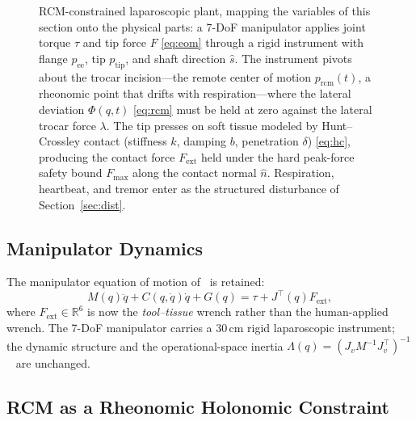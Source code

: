 \begin{figure}[t]
{}
\caption{RCM-constrained laparoscopic plant, mapping the variables of this
section onto the physical parts: a 7-DoF manipulator applies joint torque
$\tau$ and tip force $F$ \eqref{eq:eom} through a rigid instrument with flange
$p_\text{ee}$, tip $p_\text{tip}$, and shaft direction $\hat s$. The instrument
pivots about the trocar incision---the remote center of motion $p_\text{rcm}(t)$,
a rheonomic point that drifts with respiration---where the lateral deviation
$\Phi(q,t)$ \eqref{eq:rcm} must be held at zero against the lateral trocar force
$\lambda$. The tip presses on soft tissue modeled by Hunt--Crossley contact
(stiffness $k$, damping $b$, penetration $\delta$) \eqref{eq:hc}, producing the
contact force $F_\text{ext}$ held under the hard peak-force safety bound
$F_\text{max}$ along the contact normal $\hat n$. Respiration, heartbeat, and
tremor enter as the structured disturbance of Section~\ref{sec:dist}.}
\label{fig:plant}
\end{figure}

\subsection{Manipulator Dynamics}

The manipulator equation of motion of~\cite{cao2026phri} is retained:
\begin{equation}
M(q)\ddot{q} + C(q,\dot{q})\dot{q} + G(q) = \tau + J^\top(q) F_{\text{ext}},
\label{eq:eom}
\end{equation}
where $F_{\text{ext}} \in \mathbb{R}^6$ is now the \emph{tool--tissue} wrench rather than the human-applied wrench. The 7-DoF manipulator carries a 30\,cm rigid laparoscopic instrument; the dynamic structure and the operational-space inertia $\Lambda(q) = (J_v M^{-1} J_v^\top)^{-1}$~\cite{khatib1987} are unchanged.

\subsection{RCM as a Rheonomic Holonomic Constraint}

